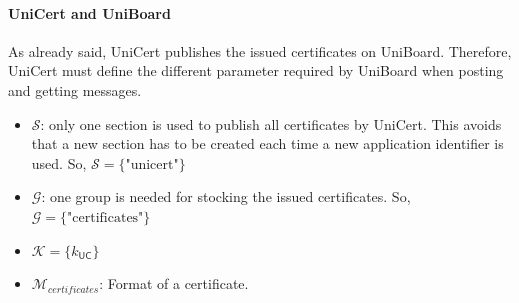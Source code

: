 \documentclass[bibtotoc,halfparskip,oneside]{scrreprt}
\newcommand{\vk}[1]{\mathit{vk}_{#1}\xspace}
\newcommand{\vkbar}[1]{\bar{\mathit{vk}}_{#1}\xspace}
\newcommand{\CA}{\ensuremath{\mathsf{CA}}\xspace}
\newcommand{\UC}{\ensuremath{\mathsf{UC}}\xspace}
\newcommand{\Voter}[1]{\ensuremath{\mathsf{V}_{#1}}\xspace}
\begin{document}
	
	
	\paragraph*{UniCert and UniBoard} As already said, UniCert publishes the issued certificates on UniBoard. Therefore, UniCert must define the different parameter required by UniBoard when posting and getting messages.
	
	\begin{itemize}
		\item $\mathcal{S}$: only one section is used to publish all certificates by UniCert. This avoids that a new section has to be created each time a new application identifier is used. So, $\mathcal{S} = \{\text{"unicert"}\}$
		\item $\mathcal{G}$: one group is needed for stocking the issued certificates. So, $\mathcal{G} = \{\text{"certificates"}\}$
		\item $\mathcal{K} = \{k_{\UC}\}$
		\item $\mathcal{M}_{certificates}$: Format of a certificate.
	\end{itemize}
	
	
\end{document}
